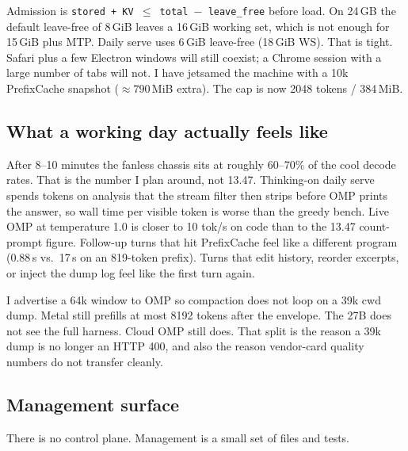 Admission is \texttt{stored + KV $\le$ total $-$ leave\_free} before load. On 24\,GB the default leave-free of 8\,GiB leaves a 16\,GiB working set, which is not enough for 15\,GiB plus MTP. Daily serve uses 6\,GiB leave-free (18\,GiB WS). That is tight. Safari plus a few Electron windows will still coexist; a Chrome session with a large number of tabs will not. I have jetsamed the machine with a 10k PrefixCache snapshot ($\approx 790$\,MiB extra). The cap is now 2048 tokens / 384\,MiB.

\subsection{What a working day actually feels like}

After 8--10 minutes the fanless chassis sits at roughly 60--70\% of the cool decode rates. That is the number I plan around, not 13.47. Thinking-on daily serve spends tokens on analysis that the stream filter then strips before OMP prints the answer, so wall time per visible token is worse than the greedy bench. Live OMP at temperature 1.0 is closer to 10 tok/s on code than to the 13.47 count-prompt figure. Follow-up turns that hit PrefixCache feel like a different program (0.88\,s vs.\ 17\,s on an 819-token prefix). Turns that edit history, reorder excerpts, or inject the dump log feel like the first turn again.

I advertise a 64k window to OMP so compaction does not loop on a 39k cwd dump. Metal still prefills at most 8192 tokens after the envelope. The 27B does not see the full harness. Cloud OMP still does. That split is the reason a 39k dump is no longer an HTTP 400, and also the reason vendor-card quality numbers do not transfer cleanly.

\subsection{Management surface}

There is no control plane. Management is a small set of files and tests.

